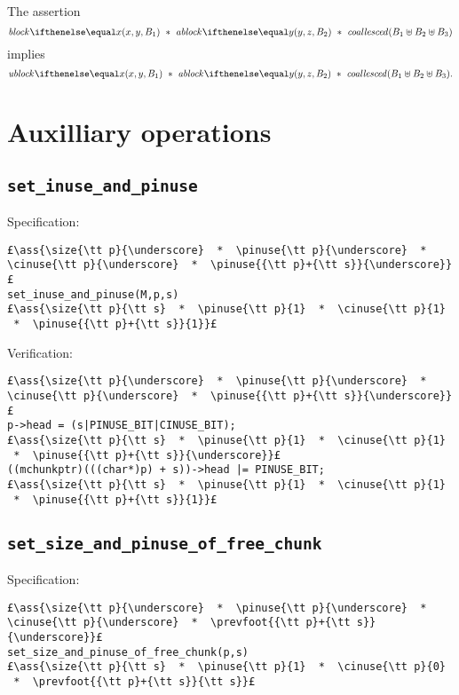 \documentclass[10pt,a4paper,twoside]{report}
\makeatletter
\newcommand{\ml}[2][t]{\mbox{\mdseries\begin{tabular}[#1]{@{}L@{}}#2\end{tabular}}}
\newcommand{\ass}[1]{\ensuremath{{\color{blue}\left\{\ml[c]{#1}\right\}}}}
\makeatother
\begin{document}
\begin{lemma}\label{lem:coallesced} The assertion
\[
\block{x}{y}{B_1}  *  \ablock{y}{z}{B_2}  *  \coallesced{B_1\uplus B_2 \uplus B_3}\]
implies
\[
\ublock{x}{y}{B_1}  *  \ablock{y}{z}{B_2}  *  \coallesced{B_1\uplus B_2 \uplus B_3}.
\]
\end{lemma}

\chapter{Auxilliary operations}\label{chap:smallbins_and_trees}

\section{\tt set\_inuse\_and\_pinuse}

Specification:
\begin{lstlisting}
£\ass{\size{\tt p}{\underscore}  *  \pinuse{\tt p}{\underscore}  *  \cinuse{\tt p}{\underscore}  *  \pinuse{{\tt p}+{\tt s}}{\underscore}}£
set_inuse_and_pinuse(M,p,s)
£\ass{\size{\tt p}{\tt s}  *  \pinuse{\tt p}{1}  *  \cinuse{\tt p}{1}  *  \pinuse{{\tt p}+{\tt s}}{1}}£
\end{lstlisting}

\noindent Verification:
\begin{lstlisting}
£\ass{\size{\tt p}{\underscore}  *  \pinuse{\tt p}{\underscore}  *  \cinuse{\tt p}{\underscore}  *  \pinuse{{\tt p}+{\tt s}}{\underscore}}£
p->head = (s|PINUSE_BIT|CINUSE_BIT);
£\ass{\size{\tt p}{\tt s}  *  \pinuse{\tt p}{1}  *  \cinuse{\tt p}{1}  *  \pinuse{{\tt p}+{\tt s}}{\underscore}}£
((mchunkptr)(((char*)p) + s))->head |= PINUSE_BIT;
£\ass{\size{\tt p}{\tt s}  *  \pinuse{\tt p}{1}  *  \cinuse{\tt p}{1}  *  \pinuse{{\tt p}+{\tt s}}{1}}£
\end{lstlisting}

\section{\tt set\_size\_and\_pinuse\_of\_free\_chunk}

Specification:
\begin{lstlisting}
£\ass{\size{\tt p}{\underscore}  *  \pinuse{\tt p}{\underscore}  *  \cinuse{\tt p}{\underscore}  *  \prevfoot{{\tt p}+{\tt s}}{\underscore}}£
set_size_and_pinuse_of_free_chunk(p,s)
£\ass{\size{\tt p}{\tt s}  *  \pinuse{\tt p}{1}  *  \cinuse{\tt p}{0}  *  \prevfoot{{\tt p}+{\tt s}}{\tt s}}£
\end{lstlisting}
\end{document}
